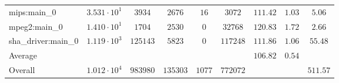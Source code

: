 \begin{tabular}{|l|c|c|c|c|c|c|c|c|}
mips:main\_0            & $ 3.531 \cdot 10^{1} $ & $ 3934   $ & $ 2676   $ & $ 16   $ & $ 3072   $ & $ 111.42      $ & $ 1.03    $ & $ 5.06    $ \\
mpeg2:main\_0           & $ 1.410 \cdot 10^{1} $ & $ 1704   $ & $ 2530   $ & $ 0    $ & $ 32768  $ & $ 120.83      $ & $ 1.72    $ & $ 2.66    $ \\
sha\_driver:main\_0     & $ 1.119 \cdot 10^{3} $ & $ 125143 $ & $ 5823   $ & $ 0    $ & $ 117248 $ & $ 111.86      $ & $ 1.06    $ & $ 55.48   $ \\
\hline
Average                 & $                    $ & $        $ & $        $ & $      $ & $        $ & $ 106.82      $ & $ 0.54    $ & $         $ \\
\hline
Overall                 & $ 1.012 \cdot 10^{4} $ & $ 983980 $ & $ 135303 $ & $ 1077 $ & $ 772072 $ & $             $ & $         $ & $ 511.57  $ \\
\hline
\end{tabular}
